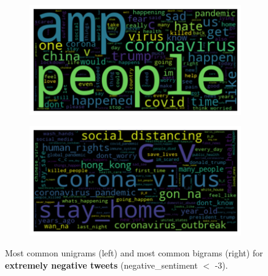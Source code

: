 \begin{figure}
    \centering
    \begin{subfigure}{0.49\columnwidth}
        \includegraphics[width=1\textwidth]{images/uni_neg.png}
    \end{subfigure}
    \centering
    \begin{subfigure}{0.49\columnwidth}
        \includegraphics[width=1\textwidth]{images/bi_neg.png}
    \end{subfigure}
    \caption{Most common unigrams (left) and most common bigrams (right) for \textbf{extremely negative tweets} (negative\_sentiment $<$ -3).}
    \label{fig:uni_bi_neg}
\end{figure}

